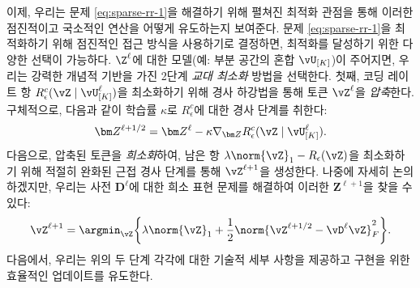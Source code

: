 \documentclass[../../book-main_ko.tex]{subfiles}
\begin{document}
이제, 우리는 문제 \eqref{eq:sparse-rr-1}을 해결하기 위해 펼쳐진 최적화 관점을 통해 이러한 점진적이고 국소적인 연산을 어떻게 유도하는지 보여준다. 문제
\eqref{eq:sparse-rr-1}을 최적화하기 위해 점진적인 접근 방식을 사용하기로 결정하면, 최적화를 달성하기 위한 다양한 선택이 가능하다. $\Z^\ell$에 대한 모델(예: 부분 공간의 혼합 $\vU_{[K]}$)이 주어지면, 우리는 강력한 개념적 기반을 가진 2단계 \textit{교대 최소화} 방법을 선택한다. 첫째, 코딩 레이트 항 $R^c_\epsilon (\vZ \mid \vU_{[K]}^\ell)$을 최소화하기 위해 경사 하강법을 통해 토큰 $\vZ^{\ell}$을 \textit{압축}한다. 구체적으로, 다음과 같이 학습률 $\kappa$로 $R^c_\epsilon$에 대한 경사 단계를 취한다:
\begin{align}\label{eq:Z l+1/2}
    \bm Z^{\ell+1/2} = \bm Z^\ell - \kappa \nabla_{\bm Z} R^c_\epsilon (\vZ \mid \vU_{[K]}^\ell). 
\end{align}
다음으로, 압축된 토큰을 \textit{희소화}하여, 남은 항 $\lambda \norm{\vZ}_{1} - R_{\epsilon}(\vZ)$을 최소화하기 위해 적절히 완화된 근접 경사 단계를 통해 \(\vZ^{\ell + 1}\)을 생성한다. 나중에 자세히 논의하겠지만, 우리는 사전 $\bm D^\ell$에 대한 희소 표현 문제를 해결하여 이러한 $\bm Z^{\ell+1}$을 찾을 수 있다:
\begin{equation}\label{eq:Z l+1}
  \vZ^{\ell+1} = \argmin_{{\vZ}}  \bigg\{\lambda \norm{\vZ}_1 + \frac{1}{2}\norm{\vZ^{\ell + 1/2} - \vD^{\ell} {\vZ}}_F^2\bigg\}.
\end{equation}
다음에서, 우리는 위의 두 단계 각각에 대한 기술적 세부 사항을 제공하고 구현을 위한 효율적인 업데이트를 유도한다.
\end{document}
